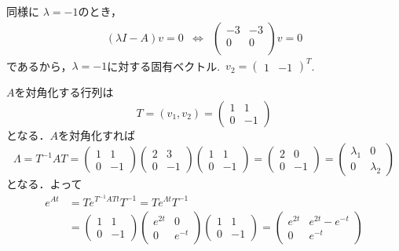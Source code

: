 \documentclass[a4paper,11pt]{jreport}
\begin{document}
同様に
$\lambda = -1$のとき，
\[
 \begin{array}{ccc}
 (\lambda I - A) v = 0
 &\Leftrightarrow&
 \left(
 \begin{array}{cc}
  -3 & -3 \\
  0 & 0 \\
 \end{array}
 \right) v = 0 
 \end{array}
\]
であるから，$\lambda = -1$に対する固有ベクトル.\
$v_2 = (\begin{array}{cc}1 & -1\end{array})^T$.

$A$を対角化する行列は
\[
 T=(v_1, v_2)
  =
 \left(
 \begin{array}{cc}
  1 & 1 \\
  0 & -1
 \end{array}
 \right)
\]
となる．$A$を対角化すれば
\[
 \Lambda = T^{-1}AT =
 \left(
 \begin{array}{cc}
  1 & 1 \\
  0 & -1
 \end{array}
 \right)
 \left(
 \begin{array}{cc}
  2 & 3 \\
  0 & -1
 \end{array}
 \right)
 \left(
 \begin{array}{cc}
  1 & 1 \\
  0 & -1
 \end{array}
 \right) =
 \left(
 \begin{array}{cc}
  2 & 0 \\
  0 & -1
 \end{array}
 \right) = 
 \left(
 \begin{array}{cc}
  \lambda_1 & 0 \\
  0 & \lambda_2
 \end{array}
 \right)
\]
となる．よって
\begin{align*}
 e^{At} &= T e^{T^{-1}AT t} T^{-1}
 = T e^{\Lambda t} T^{-1}
\\
 &=
 \left(
 \begin{array}{cc}
  1 & 1 \\
  0 & -1
 \end{array}
 \right)
 \left(
 \begin{array}{cc}
  e^{2t} & 0 \\
  0 & e^{-t}
 \end{array}
 \right)
 \left(
 \begin{array}{cc}
  1 & 1 \\
  0 & -1
 \end{array}
 \right)
 =
 \left(
 \begin{array}{cc}
  e^{2t} & e^{2t}-e^{-t} \\
  0 & e^{-t}
 \end{array}
 \right)
\end{align*}
\end{document}
